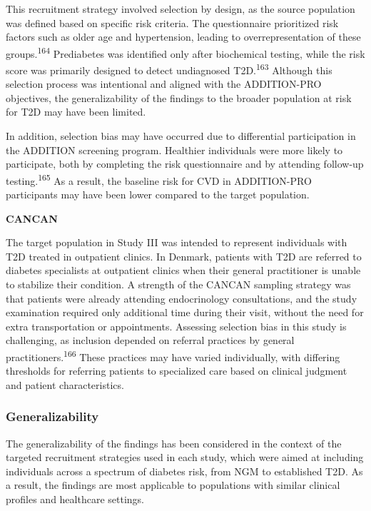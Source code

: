 \documentclass[
  a4paper,
  headsepline=true,
  open=left]{scrbook}
\begin{document}
This recruitment strategy involved selection by design, as the source
population was defined based on specific risk criteria. The
questionnaire prioritized risk factors such as older age and
hypertension, leading to overrepresentation of these
groups.\textsuperscript{164} Prediabetes was identified only after
biochemical testing, while the risk score was primarily designed to
detect undiagnosed T2D.\textsuperscript{163} Although this selection
process was intentional and aligned with the ADDITION-PRO objectives,
the generalizability of the findings to the broader population at risk
for T2D may have been limited.

In addition, selection bias may have occurred due to differential
participation in the ADDITION screening program. Healthier individuals
were more likely to participate, both by completing the risk
questionnaire and by attending follow-up testing.\textsuperscript{165}
As a result, the baseline risk for CVD in ADDITION-PRO participants may
have been lower compared to the target population.

\textbf{CANCAN}

The target population in Study III was intended to represent individuals
with T2D treated in outpatient clinics. In Denmark, patients with T2D
are referred to diabetes specialists at outpatient clinics when their
general practitioner is unable to stabilize their condition. A strength
of the CANCAN sampling strategy was that patients were already attending
endocrinology consultations, and the study examination required only
additional time during their visit, without the need for extra
transportation or appointments. Assessing selection bias in this study
is challenging, as inclusion depended on referral practices by general
practitioners.\textsuperscript{166} These practices may have varied
individually, with differing thresholds for referring patients to
specialized care based on clinical judgment and patient characteristics.

\hypertarget{generalizability}{%
\subsubsection{Generalizability}\label{generalizability}}

The generalizability of the findings has been considered in the context
of the targeted recruitment strategies used in each study, which were
aimed at including individuals across a spectrum of diabetes risk, from
NGM to established T2D. As a result, the findings are most applicable to
populations with similar clinical profiles and healthcare settings.
\end{document}
